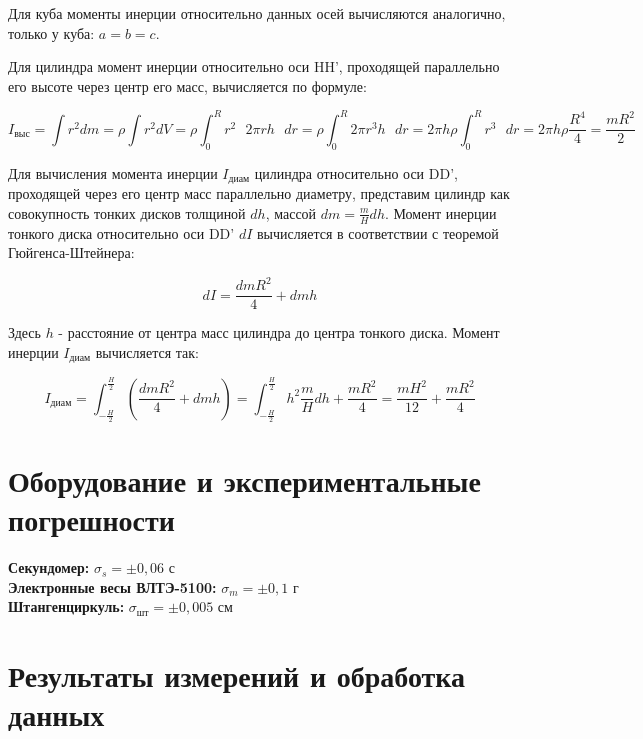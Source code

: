 \documentclass[a4paper,12pt]{article}
\begin{document}
Для куба моменты инерции относительно данных осей вычисляются аналогично, только у куба: $a = b = c$.


Для цилиндра момент инерции относительно оси HH', проходящей параллельно его высоте через центр его масс, вычисляется по формуле: 

\begin{equation}\label{actual-cil-h}
    I_\text{выс} = \int r^2 dm = \rho \int r^2 dV = \rho \int_0^R r^2 \text{ } 2 \pi r h \text{ } dr = \rho \int_0^R 2 \pi r^3 h \text{ } dr = 2 \pi h \rho \int_0^R r^3 \text{ } dr = 2 \pi h \rho \frac{R^4}{4} = \frac{mR^2}{2}
\end{equation}

Для вычисления момента инерции $I_\text{диам}$ цилиндра относительно оси DD', проходящей через его центр масс параллельно диаметру, представим цилиндр как совокупность тонких дисков толщиной $dh$, массой $dm = \frac{m}{H} dh$. Момент инерции тонкого диска относительно оси DD' $dI$ вычисляется в соответствии с теоремой Гюйгенса-Штейнера:

\begin{equation}
    dI = \frac{dmR^2}{4} + dmh
\end{equation}

Здесь $h$ - расстояние от центра масс цилиндра до центра тонкого диска. Момент инерции $I_\text{диам}$ вычисляется так:

\begin{equation}\label{actual-cil-d}
    I_\text{диам} = \int^{\frac{H}{2}}_{-\frac{H}{2}} \left( \frac{dmR^2}{4} + dmh \right) = \int^{\frac{H}{2}}_{-\frac{H}{2}} h^2 \frac{m}{H} dh + \frac{mR^2}{4} = \frac{mH^2}{12} + \frac{mR^2}{4}
\end{equation}

\section{Оборудование и экспериментальные погрешности}

\textbf{Секундомер:} $\sigma_s = \pm 0,06$ с \\ 
\textbf{Электронные весы ВЛТЭ-5100:} $\sigma_m = \pm 0,1$ г \\
\textbf{Штангенциркуль:} $\sigma_\text{шт} = \pm 0,005$ см \\

\section{Результаты измерений и обработка данных}
\end{document}
